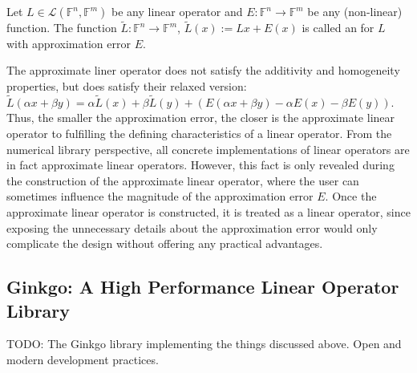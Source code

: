\begin{definition}
\label{conclusion:def:apprximate-linop}
Let $L \in \mathcal{L}(\mathbb{F}^n,\mathbb{F}^m)$ be any linear operator and $E
: \mathbb{F}^n \rightarrow \mathbb{F}^m$ be any (non-linear) function.
The function $\widetilde{L} : \mathbb{F}^n \rightarrow \mathbb{F}^m$,
$\widetilde{L}(x) := Lx + E(x)$ is called an  for $L$ with approximation error $E$.
\end{definition}

The approximate liner operator does not satisfy the additivity and homogeneity
properties, but does satisfy their relaxed version: $\widetilde{L}(\alpha x +
\beta y) = \alpha \widetilde{L}(x) + \beta \widetilde{L}(y) +
(E(\alpha x + \beta y) - \alpha E(x) - \beta E(y))$. Thus, the smaller the
approximation error, the closer is the approximate linear operator to
fulfilling the defining characteristics of a linear operator.
From the numerical library perspective, all concrete implementations of linear
operators are in fact approximate linear operators. However, this fact is only
revealed during the construction of the approximate linear operator, where the
user can sometimes influence the magnitude of the approximation error $E$. Once
the approximate linear operator is constructed, it is treated as a linear
operator, since exposing the unnecessary details about the approximation error
would only complicate the design without offering any practical advantages.

\subsection{Ginkgo: A High Performance Linear Operator Library}
TODO: The Ginkgo library implementing the things discussed above. Open and
modern development practices.

